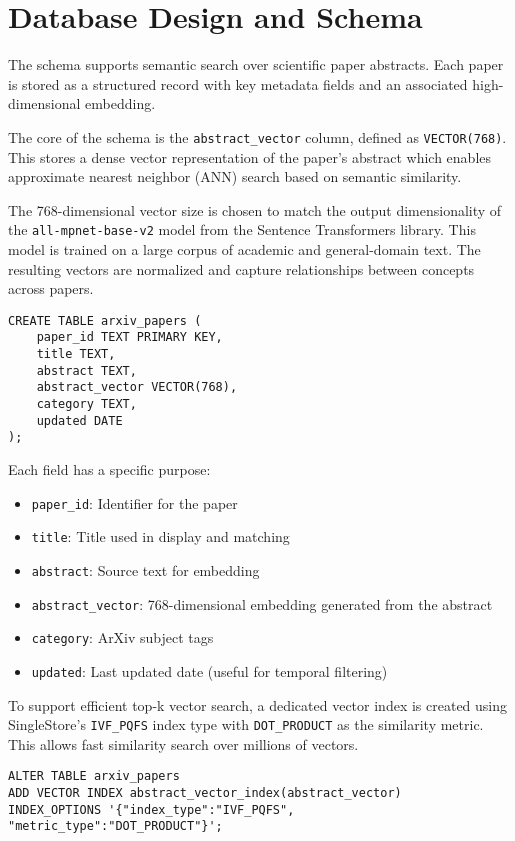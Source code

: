 \documentclass[11pt]{article}
\begin{document}
\section*{Database Design and Schema}
\label{sec:org0f00056}

The schema supports semantic search over scientific paper abstracts. Each paper is stored as a structured record with key metadata fields and an associated high-dimensional embedding.

The core of the schema is the \texttt{abstract\_vector} column, defined as \texttt{VECTOR(768)}. This stores a dense vector representation of the paper’s abstract which enables approximate nearest neighbor (ANN) search based on semantic similarity.

The 768-dimensional vector size is chosen to match the output dimensionality of the \texttt{all-mpnet-base-v2} model from the Sentence Transformers library. This model is trained on a large corpus of academic and general-domain text. The resulting vectors are normalized and capture relationships between concepts across papers.

\begin{verbatim}
CREATE TABLE arxiv_papers (
    paper_id TEXT PRIMARY KEY,
    title TEXT,
    abstract TEXT,
    abstract_vector VECTOR(768),
    category TEXT,
    updated DATE
);
\end{verbatim}

Each field has a specific purpose:
\begin{itemize}
\item \texttt{paper\_id}: Identifier for the paper
\item \texttt{title}: Title used in display and matching
\item \texttt{abstract}: Source text for embedding
\item \texttt{abstract\_vector}: 768-dimensional embedding generated from the abstract
\item \texttt{category}: ArXiv subject tags
\item \texttt{updated}: Last updated date (useful for temporal filtering)
\end{itemize}

To support efficient top-k vector search, a dedicated vector index is created using SingleStore's \texttt{IVF\_PQFS} index type with \texttt{DOT\_PRODUCT} as the similarity metric. This allows fast similarity search over millions of vectors.

\begin{verbatim}
ALTER TABLE arxiv_papers
ADD VECTOR INDEX abstract_vector_index(abstract_vector)
INDEX_OPTIONS '{"index_type":"IVF_PQFS", "metric_type":"DOT_PRODUCT"}';
\end{verbatim}
\end{document}
